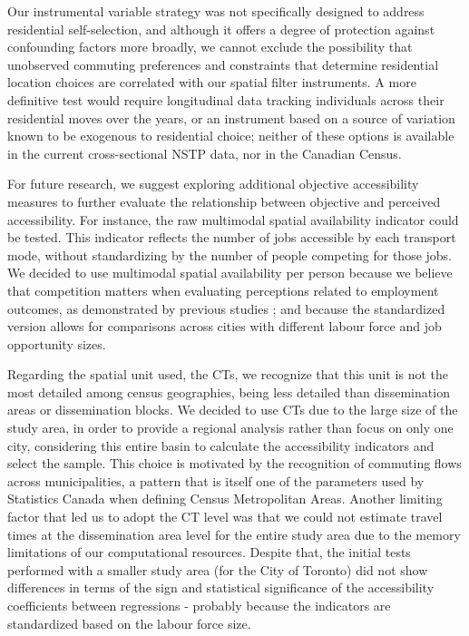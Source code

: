 \documentclass[preprint, 3p,
authoryear]{elsarticle} %
\begin{document}
Our instrumental variable strategy was not specifically designed to
address residential self-selection, and although it offers a degree of
protection against confounding factors more broadly, we cannot exclude
the possibility that unobserved commuting preferences and constraints
that determine residential location choices are correlated with our
spatial filter instruments. A more definitive test would require
longitudinal data tracking individuals across their residential moves
over the years, or an instrument based on a source of variation known to
be exogenous to residential choice; neither of these options is
available in the current cross-sectional NSTP data, nor in the Canadian
Census.

For future research, we suggest exploring additional objective
accessibility measures to further evaluate the relationship between
objective and perceived accessibility. For instance, the raw multimodal
spatial availability indicator could be tested. This indicator reflects
the number of jobs accessible by each transport mode, without
standardizing by the number of people competing for those jobs. We
decided to use multimodal spatial availability per person because we
believe that competition matters when evaluating perceptions related to
employment outcomes, as demonstrated by previous studies
\citep{jin2018, merlin2017, miller2005}; and because the standardized
version allows for comparisons across cities with different labour force
and job opportunity sizes.

Regarding the spatial unit used, the CTs, we recognize that this unit is
not the most detailed among census geographies, being less detailed than
dissemination areas or dissemination blocks. We decided to use CTs due
to the large size of the study area, in order to provide a regional
analysis rather than focus on only one city, considering this entire
basin to calculate the accessibility indicators and select the sample.
This choice is motivated by the recognition of commuting flows across
municipalities, a pattern that is itself one of the parameters used by
Statistics Canada when defining Census Metropolitan Areas. Another
limiting factor that led us to adopt the CT level was that we could not
estimate travel times at the dissemination area level for the entire
study area due to the memory limitations of our computational resources.
Despite that, the initial tests performed with a smaller study area (for
the City of Toronto) did not show differences in terms of the sign and
statistical significance of the accessibility coefficients between
regressions - probably because the indicators are standardized based on
the labour force size.
\end{document}
